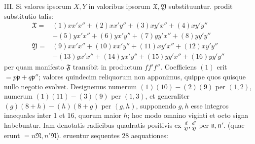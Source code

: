 III. Si valores ipsorum $X,Y$ in valoribus ipsorum $\mathfrak{X},\mathfrak{Y}$ substituuntur. prodit substitutio talis:
\[
\begin{aligned}
\mathfrak{X}={}&(1)xx'x''+(2)xx'y''+(3)xy'x''+(4)xy'y''\\
&+(5)yx'x''+(6)yx'y''+(7)yy'x''+(8)yy'y''\\
\mathfrak{Y}={}&(9)xx'x''+(10)xx'y''+(11)xy'x''+(12)xy'y''\\
&+(13)yx'x''+(14)yx'y''+(15)yy'x''+(16)yy'y''
\end{aligned}
\]
per quam manifesto $\mathfrak{F}$ transibit in productum $ff'f''$. Coefficiens $(1)$ erit $=p\mathfrak{p}+q\mathfrak{p}''$; valores quindecim reliquorum non apponimus, quippe quos quisque nullo negotio evolvet. Designemus numerum $(1)(10)-(2)(9)$ per $(1,2)$, numerum $(1)(11)-(3)(9)$ per $(1,3)$, et generaliter $(g)(8+h)-(h)(8+g)$ per $(g,h)$, supponendo $g,h$ esse integros inaequales inter 1 et 16, quorum maior $h$; hoc modo omnino viginti et octo signa habebuntur. Iam denotatis radicibus quadratis positivis ex $\frac{d}{\mathfrak{D}},\frac{d'}{\mathfrak{D}}$ per $\mathfrak{n},\mathfrak{n}'$. (quae erunt $=n\mathfrak{N},n'\mathfrak{N}$). eruentur sequentes 28 aequationes:
